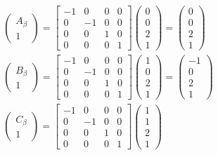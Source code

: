 \begin{gather}
	\begin{pmatrix}
		A_\beta\\1
	\end{pmatrix}
	=
	\begin{bmatrix}
		-1&0&0&0\\
		0&-1&0&0\\
		0&0&1&0\\
		0&0&0&1
	\end{bmatrix}
	\begin{pmatrix}
		0\\0\\2\\1
	\end{pmatrix}
	=
	\begin{pmatrix}
		0\\0\\2\\1
	\end{pmatrix}\\
	\begin{pmatrix}
		B_\beta\\1
	\end{pmatrix}
	=
	\begin{bmatrix}
		-1&0&0&0\\
		0&-1&0&0\\
		0&0&1&0\\
		0&0&0&1
	\end{bmatrix}
	\begin{pmatrix}
		1\\0\\2\\1
	\end{pmatrix}
	=
	\begin{pmatrix}
		-1\\0\\2\\1
	\end{pmatrix}\\
	\begin{pmatrix}
		C_\beta\\1
	\end{pmatrix}
	=
	\begin{bmatrix}
		-1&0&0&0\\
		0&-1&0&0\\
		0&0&1&0\\
		0&0&0&1
	\end{bmatrix}
	\begin{pmatrix}
		1\\1\\2\\1

\end{pmatrix}
\end{gather}
